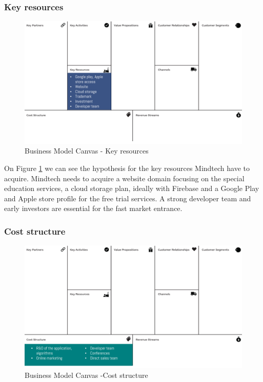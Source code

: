 \documentclass[letterpaper,10pt]{article}
\begin{document}
\subsubsection{Key resources}

\begin{figure}[!htb]
\centering
\includegraphics[scale=0.5]{res.PNG}
\caption{Business Model Canvas - Key resources}
\label{img:BMC_resources}
\end{figure}


On Figure \ref{img:BMC_resources} we can see the hypothesis for the key resources Mindtech have to acquire. Mindtech needs to acquire a website domain focusing on the special education services, a cloud storage plan, ideally with Firebase and a Google Play and Apple store profile for the free trial services. A strong developer team and early investors are essential for the fast market entrance.


\subsubsection{Cost structure}

\begin{figure}[!htb]
\centering
\includegraphics[scale=0.5]{cost.PNG}
\caption{Business Model Canvas -Cost structure }
\label{img:BMC_coststruct}
\end{figure}
\end{document}
